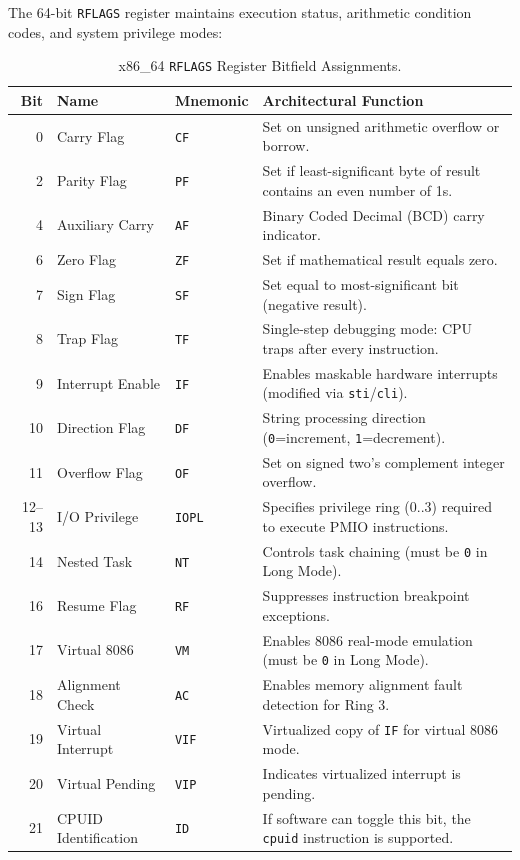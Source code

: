 The 64-bit \texttt{RFLAGS} register maintains execution status, arithmetic condition codes, and system privilege modes:

\begin{table}[htbp]
\centering
\small
\begin{tabularx}{\textwidth}{rllX}
\toprule
\textbf{Bit} & \textbf{Name} & \textbf{Mnemonic} & \textbf{Architectural Function} \\
\midrule
0 & Carry Flag & \texttt{CF} & Set on unsigned arithmetic overflow or borrow. \\
2 & Parity Flag & \texttt{PF} & Set if least-significant byte of result contains an even number of 1s. \\
4 & Auxiliary Carry & \texttt{AF} & Binary Coded Decimal (BCD) carry indicator. \\
6 & Zero Flag & \texttt{ZF} & Set if mathematical result equals zero. \\
7 & Sign Flag & \texttt{SF} & Set equal to most-significant bit (negative result). \\
8 & Trap Flag & \texttt{TF} & Single-step debugging mode: CPU traps after every instruction. \\
9 & Interrupt Enable & \texttt{IF} & Enables maskable hardware interrupts (modified via \texttt{sti}/\texttt{cli}). \\
10 & Direction Flag & \texttt{DF} & String processing direction (\texttt{0}=increment, \texttt{1}=decrement). \\
11 & Overflow Flag & \texttt{OF} & Set on signed two's complement integer overflow. \\
12--13 & I/O Privilege & \texttt{IOPL} & Specifies privilege ring (0..3) required to execute PMIO instructions. \\
14 & Nested Task & \texttt{NT} & Controls task chaining (must be \texttt{0} in Long Mode). \\
16 & Resume Flag & \texttt{RF} & Suppresses instruction breakpoint exceptions. \\
17 & Virtual 8086 & \texttt{VM} & Enables 8086 real-mode emulation (must be \texttt{0} in Long Mode). \\
18 & Alignment Check & \texttt{AC} & Enables memory alignment fault detection for Ring 3. \\
19 & Virtual Interrupt & \texttt{VIF} & Virtualized copy of \texttt{IF} for virtual 8086 mode. \\
20 & Virtual Pending & \texttt{VIP} & Indicates virtualized interrupt is pending. \\
21 & CPUID Identification & \texttt{ID} & If software can toggle this bit, the \texttt{cpuid} instruction is supported. \\
\bottomrule
\end{tabularx}
\caption{x86\_64 \texttt{RFLAGS} Register Bitfield Assignments.}
\label{tab:rflags_bits}
\end{table}

